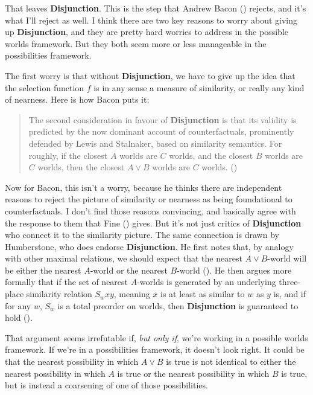 \documentclass[
  11pt,
  letterpaper,
  DIV=11,
  numbers=noendperiod,
  twoside]{scrartcl}
\begin{document}
That leaves \textbf{Disjunction}. This is the step that Andrew Bacon
() rejects, and it's what I'll reject as
well. I think there are two key reasons to worry about giving up
\textbf{Disjunction}, and they are pretty hard worries to address in the
possible worlds framework. But they both seem more or less manageable in
the possibilities framework.

The first worry is that without \textbf{Disjunction}, we have to give up
the idea that the selection function \(f\) is in any sense a measure of
similarity, or really any kind of nearness. Here is how Bacon puts it:

\begin{quote}
The second consideration in favour of \textbf{Disjunction} is that its
validity is predicted by the now dominant account of counterfactuals,
prominently defended by Lewis and Stalnaker, based on similarity
semantics. For roughly, if the closest \(A\) worlds are \(C\) worlds,
and the closest \(B\) worlds are \(C\) worlds, then the closest
\(A \vee B\) worlds are \(C\) worlds. ()
\end{quote}

Now for Bacon, this isn't a worry, because he thinks there are
independent reasons to reject the picture of similarity or nearness as
being foundational to counterfactuals. I don't find those reasons
convincing, and basically agree with the response to them that Fine
() gives. But it's not just critics of
\textbf{Disjunction} who connect it to the similarity picture. The same
connection is drawn by Humberstone, who does endorse
\textbf{Disjunction}. He first notes that, by analogy with other maximal
relations, we should expect that the nearest \(A \vee B\)-world will be
either the nearest \(A\)-world or the nearest \(B\)-world
(). He then argues
more formally that if the set of nearest \(A\)-worlds is generated by an
underlying three-place similarity relation \(S_wxy\), meaning \(x\) is
at least as similar to \(w\) as \(y\) is, and if for any \(w\), \(S_w\)
is a total preorder on worlds, then \textbf{Disjunction} is guaranteed
to hold ().

That argument seems irrefutable if, \emph{but only if}, we're working in
a possible worlds framework. If we're in a possibilities framework, it
doesn't look right. It could be that the nearest possibility in which
\(A \vee B\) is true is not identical to either the nearest possibility
in which \(A\) is true or the nearest possibility in which \(B\) is
true, but is instead a coarsening of one of those possibilities.
\end{document}
